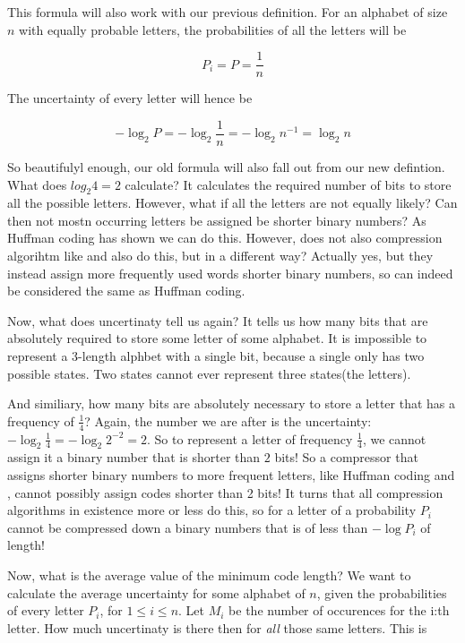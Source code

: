 This formula will also work with our previous definition. For an
alphabet of size $n$ with equally probable letters, the probabilities
of all the letters will be

\begin{equation*}
  P_i = P = \frac{1}{n}
\end{equation*}

The uncertainty of every letter will hence be

\begin{equation*}
  -\log_2 P = -\log_2 \frac{1}{n} = -\log_2 n^{-1} = \log_2 n
\end{equation*}

So beautifulyl enough, our old formula will also fall out from our new
defintion. What does $log_2 4 = 2$ calculate? It calculates the
required number of bits to store all the possible letters. However,
what if all the letters are not equally likely? Can then not mostn
occurring letters be assigned be shorter binary numbers? As Huffman
coding has shown we can do this. However, does not also compression
algorihtm like \lzw and \lzone also do this, but in a different way?
Actually yes, but they instead assign more frequently used words
shorter binary numbers, so can indeed be considered the same as
Huffman coding.

Now, what does uncertinaty tell us again? It tells us how many bits
that are absolutely required to store some letter of some alphabet. It
is impossible to represent a 3-length alphbet with a single bit,
because a single only has two possible states. Two states cannot ever
represent three states(the letters).

And similiary, how many bits are absolutely necessary to store a
letter that has a frequency of $\frac{1}{4}$? Again, the number we are
after is the uncertainty: $-\log_2 \frac{1}{4} = -\log_2 2^{-2} =
2$. So to represent a letter of frequency $\frac{1}{4}$, we cannot
assign it a binary number that is shorter than $2$ bits! So a
compressor that assigns shorter binary numbers to more frequent
letters, like Huffman coding and \lzone, cannot possibly assign codes
shorter than 2 bits! It turns that all compression algorithms in
existence more or less do this, so for a letter of a probability $P_i$
cannot be compressed down a binary numbers that is of less than
$-\log P_i$ of length!

Now, what is the average value of the minimum code length? We want to
calculate the average uncertainty for some alphabet of $n$, given the
probabilities of every letter $P_i$, for $1 \le i \le n$. Let $M_i$ be
the number of occurences for the i:th letter. How much uncertinaty is
there then for \textit{all} those same letters. This is

